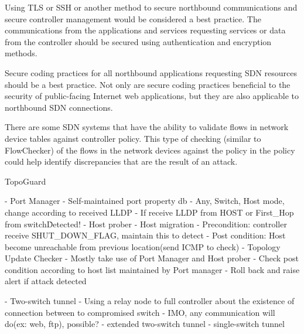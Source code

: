 Using TLS or SSH or another method to secure northbound communications and secure controller management would be considered a best practice.  The communications from the applications and services requesting services or data from the controller should be secured using authentication and encryption methods.

Secure coding practices for all northbound applications requesting SDN resources should be a best practice.  Not only are secure coding practices beneficial to the security of public-facing Internet web applications, but they are also applicable to northbound SDN connections.

There are some SDN systems that have the ability to validate flows in network device tables against controller policy.  This type of checking (similar to FlowChecker) of the flows in the network devices against the policy in the policy could help identify discrepancies that are the result of an attack.

TopoGuard

- Port Manager
    - Self-maintained port property db
    - Any, Switch, Host mode, change according to received LLDP
    - If receive LLDP from HOST or First\_Hop from switch\.Detected!
- Host prober
    - Host migration
        - Precondition: controller receive SHUT\_DOWN\_FLAG, maintain this to detect
        - Post condition: Host become unreachable from previous location(send ICMP to check)
- Topology Update Checker
    - Mostly take use of Port Manager and Host prober
    - Check post condition according to host list maintained by Port manager
    - Roll back and raise alert if attack detected

- Two-switch tunnel
    - Using a relay node to full controller about the existence of connection between to compromised switch
    - IMO, any communication will do(ex: web, ftp), possible?
- extended two-switch tunnel
- single-switch tunnel
